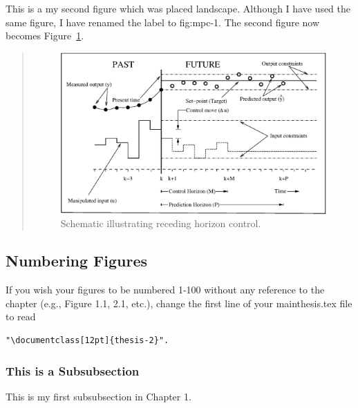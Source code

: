 This is a my second figure which was placed landscape.  Although I have used the same figure, I have renamed the label to fig:mpc-1.  The second figure now becomes Figure~\ref{fig:mpc-1}.
\begin{landscape}
\renewcommand{\baselinestretch}{1}
\small\normalsize
\begin{quote}
\begin{figure}
\begin{center}
\includegraphics[width=8.2in]{mpc.eps}
\end{center}
\caption[Figure placed landscape on page.]{Schematic illustrating receding horizon control. \label{fig:mpc-1}}
\end{figure}
\end{quote}
\renewcommand{\baselinestretch}{2}
\small\normalsize
\end{landscape}

\subsection{Numbering Figures}

If you wish your figures to be numbered 1-100 without any reference to the chapter (e.g., Figure 1.1, 2.1, etc.), change the first line of your mainthesis.tex file to read \begin{verbatim}"\documentclass[12pt]{thesis-2}".\end{verbatim}

\subsubsection{This is a Subsubsection}

This is my first subsubsection in Chapter 1.


